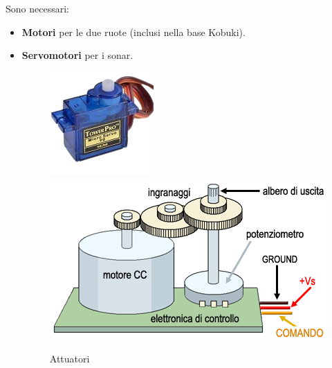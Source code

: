\documentclass[]{article}
\begin{document}
Sono necessari:
\begin{itemize}
    \item \textbf{Motori} per le due ruote (inclusi nella base Kobuki).
    \item \textbf{Servomotori} per i sonar.
        \begin{figure}[H]
            \centering
            \includegraphics[height=0.2\linewidth]{immagini/servomotore.png}
            \hspace*{5pt}
            \includegraphics[height=0.2\linewidth]{immagini/servomotori_spiegazione.png}
            \caption{Attuatori}
        \end{figure}
\end{itemize}
\end{document}
